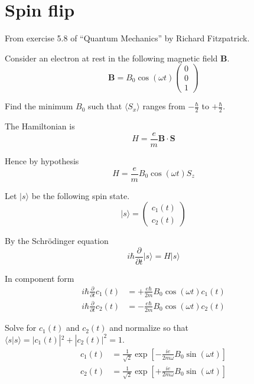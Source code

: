 

\section*{Spin flip}

From exercise 5.8 of ``Quantum Mechanics'' by Richard Fitzpatrick.

\bigskip
Consider an electron at rest in the following magnetic field $\mathbf B$.
\begin{equation*}
\mathbf B=B_0\cos(\omega t)\begin{pmatrix}0\\0\\1\end{pmatrix}
\end{equation*}

Find the minimum $B_0$ such that $\langle S_x\rangle$ ranges from
$-\frac{\hbar}{2}$ to $+\frac{\hbar}{2}$.

\bigskip
The Hamiltonian is
\begin{equation*}
H=\frac{e}{m}\mathbf B\cdot\mathbf S
\end{equation*}

Hence by hypothesis
\begin{equation*}
H=\frac{e}{m}B_0\cos(\omega t)S_z
\end{equation*}

Let $|s\rangle$ be the following spin state.
\begin{equation*}
|s\rangle=\begin{pmatrix}c_1(t)\\[1ex]c_2(t)\end{pmatrix}
\end{equation*}

By the Schr\"odinger equation
\begin{equation*}
i\hbar\frac{\partial}{\partial t}|s\rangle=H|s\rangle
\end{equation*}

In component form
\begin{align*}
i\hbar\frac{\partial}{\partial t}c_1(t)&=+\frac{e\hbar}{2m}B_0\cos(\omega t)c_1(t)
\\
i\hbar\frac{\partial}{\partial t}c_2(t)&=-\frac{e\hbar}{2m}B_0\cos(\omega t)c_2(t)
\end{align*}

Solve for $c_1(t)$ and $c_2(t)$ and normalize so that $\langle s|s\rangle=|c_1(t)|^2+|c_2(t)|^2=1$.
\begin{equation*}
\begin{aligned}
c_1(t)&=\frac{1}{\sqrt2}\exp\left[-\frac{ie}{2m\omega}B_0\sin(\omega t)\right]
\\
c_2(t)&=\frac{1}{\sqrt2}\exp\left[+\frac{ie}{2m\omega}B_0\sin(\omega t)\right]
\end{aligned}
\tag{1}
\end{equation*}

